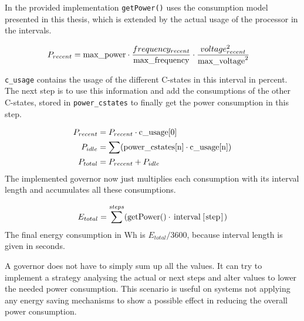 In the provided implementation \lstinline!getPower()! uses the consumption model presented in this thesis, which is extended by the actual usage of the processor in the intervals.

%
\begin{align*}
P_{recent} &= \text{\lstinline!max_power!} \cdot \frac{frequency_{recent}}{\text{\lstinline!max_frequency!}} \cdot \frac{voltage_{recent}^2}{\text{\lstinline!max_voltage!}^2}
\end{align*}
%

%
\lstinline!c_usage! contains the usage of the different C-states in this interval in percent. The next step is to use this information and add the consumptions of the other C-states, stored in \lstinline!power_cstates! to finally get the power consumption in this step.

\begin{align*}
P_{recent} &= P_{recent} \cdot \text{\lstinline!c_usage[0]!}\\
P_{idle} &= \sum (\text{\lstinline!power_cstates[n]!} \cdot \text{\lstinline!c_usage[n]!})\\
P_{total} &= P_{recent} + P_{idle}
\end{align*}
%
The implemented governor now just multiplies each consumption with its interval length and accumulates all these consumptions. 

\begin{align*}
E_{total} = \sum\limits^{steps} (\text{\lstinline!getPower()!} \cdot \text{\lstinline!interval[step]!})
\end{align*}
%
The final energy consumption in Wh is $E_{total} / 3600$, because interval length is given in seconds.

A governor does not have to simply sum up all the values. It can try to implement a strategy analysing the actual or next steps and alter values to lower the needed power consumption. This scenario is useful on systems not applying any energy saving mechanisms to show a possible effect in reducing the overall power consumption.

